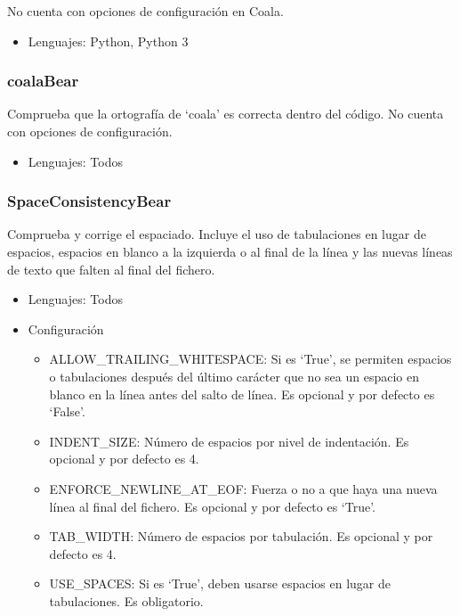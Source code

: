 \documentclass[a4paper, 12pt]{book}
\begin{document}
No cuenta con opciones de configuración en Coala.

\begin{itemize}
  \item Lenguajes: Python, Python 3
\end{itemize}

\subsubsection{coalaBear}
\label{sec:seccion1.2.16}
Comprueba que la ortografía de `coala' es correcta dentro del código. No cuenta con opciones de configuración.

\begin{itemize}
  \item Lenguajes: Todos
\end{itemize}

\subsubsection{SpaceConsistencyBear}
\label{sec:seccion1.2.17}
Comprueba y corrige el espaciado. Incluye el uso de tabulaciones en lugar de espacios, espacios en blanco a la izquierda o al final de la línea y las nuevas líneas de texto que falten al final del fichero.

\begin{itemize}
  \item Lenguajes: Todos
  \item Configuración
    \begin{itemize}
          \item ALLOW\_TRAILING\_WHITESPACE: Si es `True', se permiten espacios o tabulaciones después del último carácter que no sea un espacio en blanco en la línea antes del salto de línea. Es opcional y por defecto es `False'.
          \item INDENT\_SIZE: Número de espacios por nivel de indentación. Es opcional y por defecto es 4.
          \item ENFORCE\_NEWLINE\_AT\_EOF: Fuerza o no a que haya una nueva línea al final del fichero. Es opcional y por defecto es `True'.
          \item TAB\_WIDTH: Número de espacios por tabulación. Es opcional y por defecto es 4.
          \item USE\_SPACES: Si es `True', deben usarse espacios en lugar de tabulaciones. Es obligatorio.
    \end{itemize}
\end{itemize}
\end{document}
